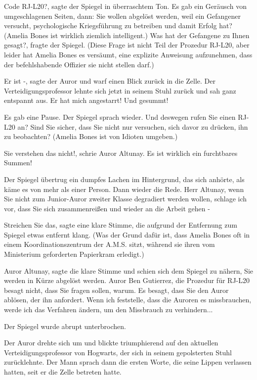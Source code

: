 \glqq{}Code RJ-L20?\grqq{}, sagte der Spiegel in überraschtem Ton. Es gab ein
Geräusch von umgeschlagenen Seiten, dann: \glqq{}Sie wollen abgelöst werden, weil
ein Gefangener versucht, psychologische Kriegsführung zu betreiben und damit
Erfolg hat?\grqq{} (Amelia Bones ist wirklich ziemlich intelligent.) \glqq{}Was
hat der Gefangene zu Ihnen gesagt?\grqq{}, fragte der Spiegel. (Diese Frage ist
nicht Teil der Prozedur RJ-L20, aber leider hat Amelia Bones es versäumt, eine
explizite Anweisung aufzunehmen, dass der befehlshabende Offizier sie nicht
stellen darf.)

\glqq{}Er ist -\grqq{}, sagte der Auror und warf einen Blick zurück in die Zelle.
Der Verteidigungsprofessor lehnte sich jetzt in seinem Stuhl zurück und sah ganz
entspannt aus. \glqq{}Er hat mich angestarrt! Und gesummt!\grqq{}

Es gab eine Pause. Der Spiegel sprach wieder. \glqq{}Und deswegen rufen Sie einen
RJ-L20 an? Sind Sie sicher, dass Sie nicht nur versuchen, sich davor zu drücken,
ihn zu beobachten?\grqq{} (Amelia Bones ist von Idioten umgeben.)

\glqq{}Sie verstehen das nicht!\grqq{}, schrie Auror Altunay. \glqq{}Es ist
wirklich ein furchtbares Summen!\grqq{}

Der Spiegel übertrug ein dumpfes Lachen im Hintergrund, das sich anhörte, als
käme es von mehr als einer Person. Dann wieder die Rede. \glqq{}Herr Altunay,
wenn Sie nicht zum Junior-Auror zweiter Klasse degradiert werden wollen, schlage
ich vor, dass Sie sich zusammenreißen und wieder an die Arbeit gehen -\grqq{}

\glqq{}Streichen Sie das\grqq{}, sagte eine klare Stimme, die aufgrund der
Entfernung zum Spiegel etwas entfernt klang. (Was der Grund dafür ist, dass
Amelia Bones oft in einem Koordinationszentrum der A.M.S. sitzt, während sie
ihren vom Ministerium geforderten Papierkram erledigt.)

\glqq{}Auror Altunay\grqq{}, sagte die klare Stimme und schien sich dem Spiegel
zu nähern, \glqq{}Sie werden in Kürze abgelöst werden. Auror Ben Gutierrez, die
Prozedur für RJ-L20 besagt nicht, dass Sie fragen sollen, warum. Es besagt, dass
Sie den Auror ablösen, der ihn anfordert. Wenn ich feststelle, dass die Auroren
es missbrauchen, werde ich das Verfahren ändern, um den Missbrauch zu
verhindern...\grqq{}

Der Spiegel wurde abrupt unterbrochen.

Der Auror drehte sich um und blickte triumphierend auf den aktuellen
Verteidigungsprofessor von Hogwarts, der sich in seinem gepolsterten Stuhl
zurücklehnte. Der Mann sprach dann die ersten Worte, die seine Lippen verlassen
hatten, seit er die Zelle betreten hatte.

